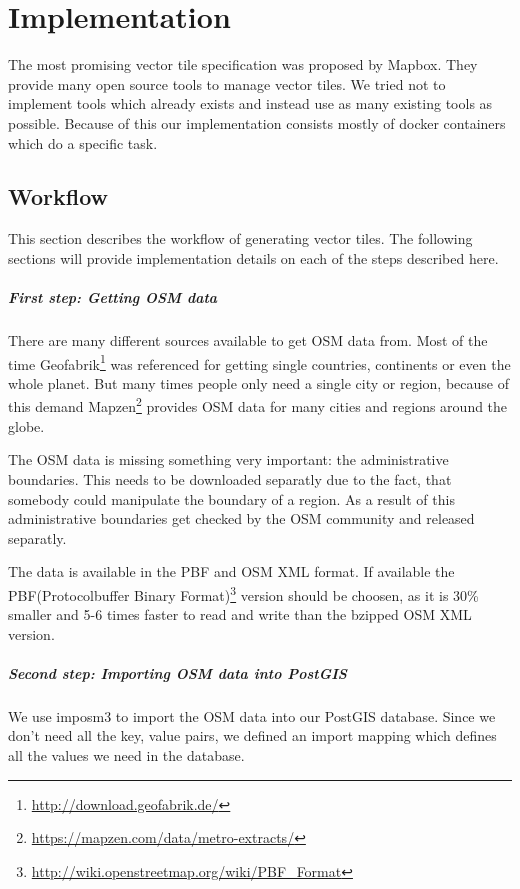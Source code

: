 \chapter{Implementation}\label{implementation}

The most promising vector tile specification was proposed by Mapbox.
They provide many open source tools to manage vector tiles. We tried not to implement tools which already exists and instead use as many existing tools as possible. Because of this our implementation consists mostly of docker containers which do a specific task.

\section{Workflow}\label{workflow}
This section describes the workflow of generating vector tiles. The following sections will provide implementation details on each of the steps described here. 

\paragraph{First step: Getting OSM data}

There are many different sources available to get OSM data from. Most of
the time Geofabrik\footnote{\url{http://download.geofabrik.de/}} was
referenced for getting single countries, continents or even the whole
planet. But many times people only need a single city or region, because
of this demand
Mapzen\footnote{\url{https://mapzen.com/data/metro-extracts/}} provides
OSM data for many cities and regions around the globe.

The OSM data is missing something very important: the administrative
boundaries. This needs to be downloaded separatly due to the fact, that
somebody could manipulate the boundary of a region. As a result of this
administrative boundaries get checked by the OSM community and released
separatly.

The data is available in the PBF and OSM XML format. If available the
PBF(Protocolbuffer Binary
Format)\footnote{\url{http://wiki.openstreetmap.org/wiki/PBF_Format}}
version should be choosen, as it is 30\% smaller and 5-6 times faster to
read and write than the bzipped OSM XML version.

\paragraph{Second step: Importing OSM data into PostGIS}
We use imposm3 to import the OSM data into our PostGIS database. Since we don't need all the key, value pairs, we defined an import mapping which defines all the values we need in the database.

